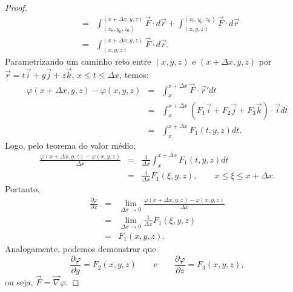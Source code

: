\begin{proof}
\begin{eqnarray*}
&=&\int_{(x_0,y_0,z_0)}^{(x+\Delta x,y,z)} \vec{F}\cdot d\vec{r}+\int^{(x_0,y_0,z_0)}_{(x,y,z)} \vec{F}\cdot d\vec{r}\\
&=&\int_{(x,y,z)}^{(x+\Delta x,y,z)} \vec{F}\cdot d\vec{r}.
\end{eqnarray*}
Parametrizando um caminho reto entre $(x,y,z)$ e $(x+\Delta x,y,z)$ por $\vec{r}=t\vec{i}+y\vec{j}+z\vec{k}$, $x\leq t\leq \Delta x$, temos:
\begin{eqnarray*}
\varphi(x+\Delta x,y,z)-\varphi(x,y,z)&=&\int_x^{x+\Delta x} \vec{F}\cdot \vec{r}' dt \\
&=&\int_x^{x+\Delta x} \left(F_1\vec{i}+F_2\vec{j}+F_3\vec{k}\right)\cdot \vec{i} dt\\
&=&\int_x^{x+\Delta x} F_1 (t,y,z) dt .
\end{eqnarray*}
Logo, pelo teorema do valor médio,
\begin{eqnarray*}
\frac{\varphi(x+\Delta x,y,z)-\varphi(x,y,z)}{\Delta x}&=& \frac{1}{\Delta x}\int_x^{x+\Delta x} F_1 (t,y,z) dt\\
&=& \frac{1}{\Delta x}  F_1 (\xi,y,z) , \qquad x\leq \xi\leq x+\Delta x.
\end{eqnarray*}
Portanto,
\begin{eqnarray*}
\frac{\partial \varphi}{\partial x}&=&\lim_{\Delta x\to 0}\frac{\varphi(x+\Delta x,y,z)-\varphi(x,y,z)}{\Delta x}\\
&=&\lim_{\Delta x\to 0} \frac{1}{\Delta x}  F_1 (\xi,y,z)\\
&=&F_1 (x,y,z).
\end{eqnarray*}
Analogamente, podemos demonstrar que
$$
\frac{\partial \varphi}{\partial y}=F_2(x,y,z) \qquad \text{e}\qquad \frac{\partial \varphi}{\partial z}=F_3(x,y,z),
$$
ou seja, $\vec{F}=\vec{\nabla}\varphi.$
\end{proof}


